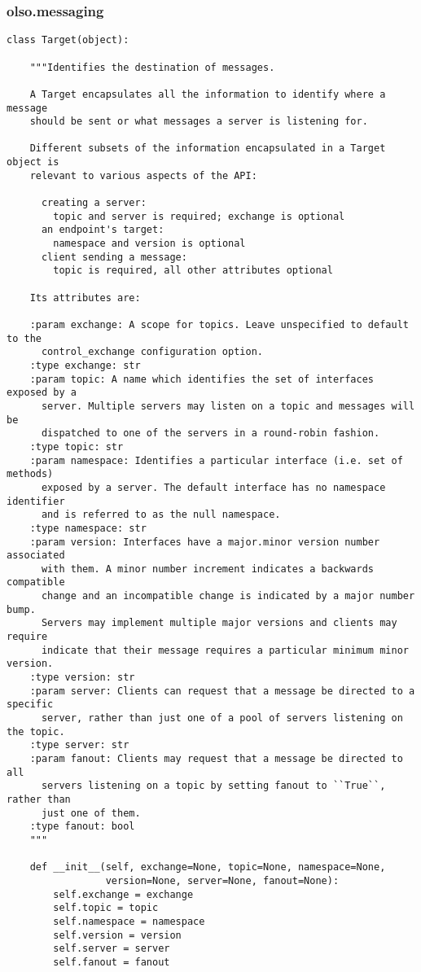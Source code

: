 \documentclass[a4paper,left=2.5cm,right=2.5cm,11pt]{article}
\begin{document}
\subsubsection{olso.messaging}
   \begin{lstlisting}
class Target(object):

    """Identifies the destination of messages.

    A Target encapsulates all the information to identify where a message
    should be sent or what messages a server is listening for.

    Different subsets of the information encapsulated in a Target object is
    relevant to various aspects of the API:

      creating a server:
        topic and server is required; exchange is optional
      an endpoint's target:
        namespace and version is optional
      client sending a message:
        topic is required, all other attributes optional

    Its attributes are:

    :param exchange: A scope for topics. Leave unspecified to default to the
      control_exchange configuration option.
    :type exchange: str
    :param topic: A name which identifies the set of interfaces exposed by a
      server. Multiple servers may listen on a topic and messages will be
      dispatched to one of the servers in a round-robin fashion.
    :type topic: str
    :param namespace: Identifies a particular interface (i.e. set of methods)
      exposed by a server. The default interface has no namespace identifier
      and is referred to as the null namespace.
    :type namespace: str
    :param version: Interfaces have a major.minor version number associated
      with them. A minor number increment indicates a backwards compatible
      change and an incompatible change is indicated by a major number bump.
      Servers may implement multiple major versions and clients may require
      indicate that their message requires a particular minimum minor version.
    :type version: str
    :param server: Clients can request that a message be directed to a specific
      server, rather than just one of a pool of servers listening on the topic.
    :type server: str
    :param fanout: Clients may request that a message be directed to all
      servers listening on a topic by setting fanout to ``True``, rather than
      just one of them.
    :type fanout: bool
    """

    def __init__(self, exchange=None, topic=None, namespace=None,
                 version=None, server=None, fanout=None):
        self.exchange = exchange
        self.topic = topic
        self.namespace = namespace
        self.version = version
        self.server = server
        self.fanout = fanout


\end{lstlisting}
\end{document}
